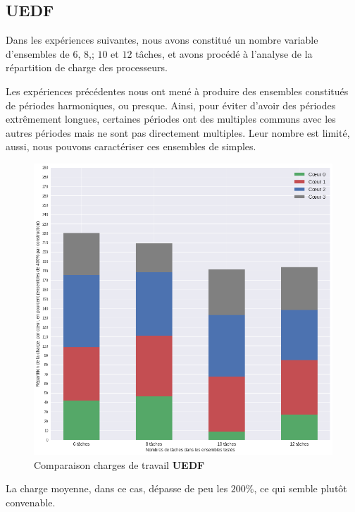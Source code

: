 	\subsection{UEDF}
	Dans les expériences suivantes, nous avons constitué un nombre variable d'ensembles de $6$, $8$,; $10$ et $12$ tâches, 
	et avons procédé à l'analyse de la répartition de charge des processeurs.\newline
	
	Les expériences précédentes nous ont mené à produire des ensembles constitués de 
	périodes harmoniques, ou \og{}presque\fg{}. Ainsi, pour éviter d'avoir des 
	périodes extrêmement longues, certaines périodes ont des multiples communs 
	avec les autres périodes mais ne sont pas directement multiples. Leur nombre est limité, aussi, nous pouvons 
	caractériser ces ensembles de \og{}simples\fg{}.\newline

	\begin{figure}[H]
		\label{loadevolution}
		\caption{Comparaison charges de travail \textbf{UEDF}}
		\includegraphics[scale=0.5]{img/wcet/repartitiondecharges_uedf}
	\end{figure}		
	
	La charge moyenne, dans ce cas, dépasse de peu les $200\%$, ce qui semble plutôt convenable. \newline
	
